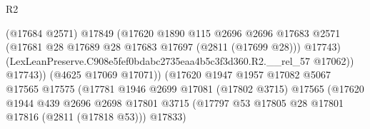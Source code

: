 \begin{lexlean}{R2}
\begin{coremodule}
                                              (@17684 @2571)
                                              @17849
                                              (@17620
                                                @1890
                                                @115
                                                @2696
                                                @2696
                                                @17683
                                                @2571
                                                (@17681
                                                  @28
                                                  @17689
                                                  @28
                                                  @17683
                                                  @17697
                                                  (@2811 (@17699 @28)))
                                                @17743)
                                              (LexLeanPreserve.C908e5fef0bdabc2735eaa4b5c3f3d360.R2.__rel_57
                                                @17062))
                                            @17743))
                                        (@4625 @17069 @17071))
                                      (@17620
                                        @1947
                                        @1957
                                        @17082
                                        @5067
                                        @17565
                                        @17575
                                        (@17781
                                          @1946
                                          @2699
                                          @17081
                                          (@17802 @3715)
                                          @17565
                                          (@17620
                                            @1944
                                            @439
                                            @2696
                                            @2698
                                            @17801
                                            @3715
                                            (@17797
                                              @53
                                              @17805
                                              @28
                                              @17801
                                              @17816
                                              (@2811 (@17818 @53)))
                                            @17833)

\end{coremodule}
\end{lexlean}
